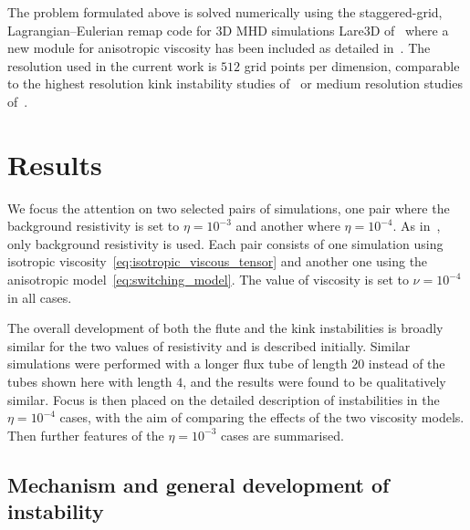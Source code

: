 \documentclass[fleqn,usenatbib]{mnras}
\begin{document}
The problem formulated above is solved numerically using the staggered-grid,
Lagrangian–Eulerian remap code for 3D MHD simulations Lare3D
of~\cite{arberStaggeredGridLagrangian2001} where a  new module for anisotropic
viscosity has been included as detailed
in~\citet{quinnKelvinHelmholtzInstabilityCollapse2021}. The resolution used in
the current work is  $512$ grid points per dimension, comparable to the highest
resolution kink instability studies of~\cite{hoodCoronalHeatingMagnetic2009} or
medium resolution studies of~\cite{barefordShockHeatingNumerical2015}. 

\section{Results}
\label{sec-results}

We focus the attention on two selected pairs of  simulations, one pair where
the background resistivity is set to $\eta=10^{-3}$ and another where
$\eta=10^{-4}$. As in~\citet{quinnEffectAnisotropicViscosity2020}, only
background resistivity is used. Each pair consists of one simulation using
isotropic viscosity~\eqref{eq:isotropic_viscous_tensor} and another one using
the anisotropic model~\eqref{eq:switching_model}. The value of viscosity is set
to $\nu = 10^{-4}$ in all cases. 

The overall development of both the flute and the kink instabilities is broadly
similar for the two values of resistivity and is described  initially. Similar
simulations were performed with a longer flux tube of length $20$ instead of
the tubes shown here with length $4$, and the results were found to be
qualitatively similar. Focus is then placed on the detailed description of
instabilities in the $\eta=10^{-4}$ cases, with the aim of comparing the
effects of the two viscosity models. Then further features of the
$\eta=10^{-3}$ cases are summarised.

\subsection{Mechanism and
    general development of instability}
\end{document}
